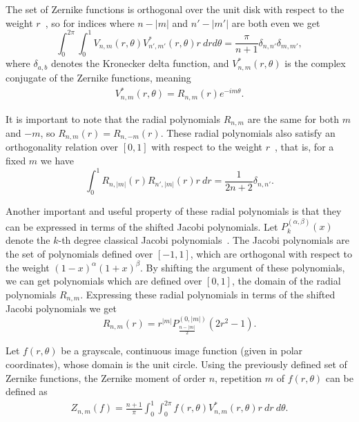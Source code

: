 The set of Zernike functions is orthogonal over the unit disk with respect to the weight $r$~\cite{zernike_moments}, so for indices where $n - |m|$ and $n' - |m'|$ are both even we get
\begin{equation}\label{Zortho}
	\int_0^{2\pi}\int_0^1 V_{n,m}(r,\theta)V_{n',m'}^*(r,\theta)r\ dr d\theta  = \frac{\pi}{n + 1}\delta_{n,n'}\delta_{m,m'},
\end{equation}
where $\delta_{a,b}$ denotes the Kronecker delta function, and $V_{n,m}^{*}(r,\theta)$ is the complex conjugate of the Zernike functions, meaning
\begin{gather*}
    V_{n,m}^{*}(r,\theta) = R_{n,m}(r) e^{-i m\theta}.
\end{gather*}

It is important to note that the radial polynomials $R_{n,m}$ are the same for both $m$ and $-m$, so $R_{n,m}(r) = R_{n,-m}(r)$. These radial polynomials also satisfy an orthogonality relation over $[0,1]$ with respect to the weight $r$~\cite{schipp}, that is, for a fixed $m$ we have
\begin{equation}\label{Rortho}
	\int_0^1 R_{n,|m|}(r) R_{n',|m|}(r)r\ dr  = \frac{1}{2n+2} \delta_{n,n'}.
\end{equation}


Another important and useful property of these radial polynomials is that they can be expressed in terms of the shifted Jacobi polynomials. Let $P_k^{(\alpha, \beta)}(x)$ denote the $k$-th degree classical Jacobi polynomials~\cite{Szego}. The Jacobi polynomials are the set of polynomials defined over $[-1,1]$, which are orthogonal with respect to the weight $(1-x)^\alpha(1+x)^\beta$. By shifting the argument of these polynomials, we can get polynomials which are defined over $[0,1]$, the domain of the radial polynomials $R_{n,m}$. Expressing these radial polynomials in terms of the shifted Jacobi polynomials we get
\begin{equation}\label{RJacobi}
	R_{n,m}(r) = r^{|m|} P_{\frac{n - |m|}{2}}^{(0,|m|)}(2r^2-1).
\end{equation} 


Let $f(r,\theta)$ be a grayscale, continuous image function (given in polar coordinates), whose domain is the unit circle.
Using the previously defined set of Zernike functions, the Zernike moment of order $n$, repetition $m$ of $f(r,\theta)$ can be defined as
\begin{gather}\label{eq:complex_zernike_def}
    Z_{n,m}(f) = \frac{n + 1}{\pi}\int_0^1\int_0^{2\pi}f(r,\theta)V_{n,m}^{*}(r,\theta)r\ dr\ d\theta.
\end{gather}


